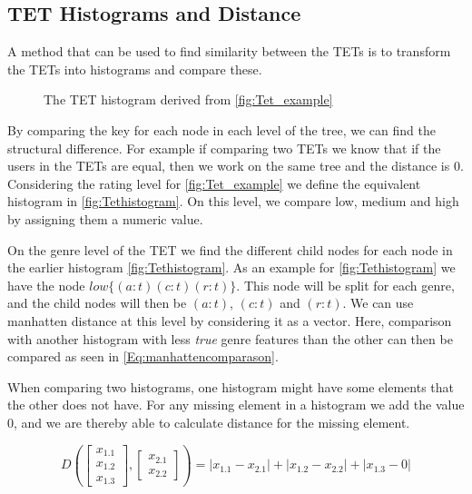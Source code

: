 \subsection{TET Histograms and Distance}
	A method that can be used to find similarity between the TETs is to transform the TETs into histograms and compare these\cite{JAEGER201330}.
	\begin{figure}[H]
		\centering
		\begin{adjustbox}{width=0.5\textwidth}
			
		\end{adjustbox}
		\caption{The TET histogram derived from \autoref{fig:Tet_example}}
		\label{fig:Tethistogram}
	\end{figure}

	By comparing the key for each node in each level of the tree, we can find the structural difference. For example if comparing two TETs we know that if the users in the TETs are equal, then we work on the same tree and the distance is $0$. Considering the rating level for \autoref{fig:Tet_example} we define the equivalent histogram in \autoref{fig:Tethistogram}. On this level, we compare low, medium and high by assigning them a numeric value.

	On the genre level of the TET we find the different child nodes for each node in the earlier histogram \autoref{fig:Tethistogram}. As an example for  \autoref{fig:Tethistogram} we have the node  $low\{(a:t)(c:t)(r:t)\}$. This node will be split for each genre,  and the child nodes will then be  $(a:t)$, $(c:t)$ and $(r:t)$. We can use manhatten distance at this level by considering it as a vector. Here, comparison with another histogram with less \textit{true} genre features than the other can then be compared as seen in \autoref{Eq:manhattencomparason}\cite{singh2013k}.

	When comparing two histograms, one histogram might have some elements that the other does not have. For any missing element in a histogram we add the value $0$, and we are thereby able to calculate distance for the missing element.

	\begin{equation}\label{Eq:manhattencomparason}
	D(\begin{bmatrix}
	x_{1.1} \\
	x_{1.2} \\
	x_{1.3}
	\end{bmatrix},
	\begin{bmatrix}
	x_{2.1} \\
	x_{2.2}
	\end{bmatrix})= |x_{1.1} - x_{2.1}| + |x_{1.2} - x_{2.2}| + |x_{1.3} - 0|
	\end{equation}

